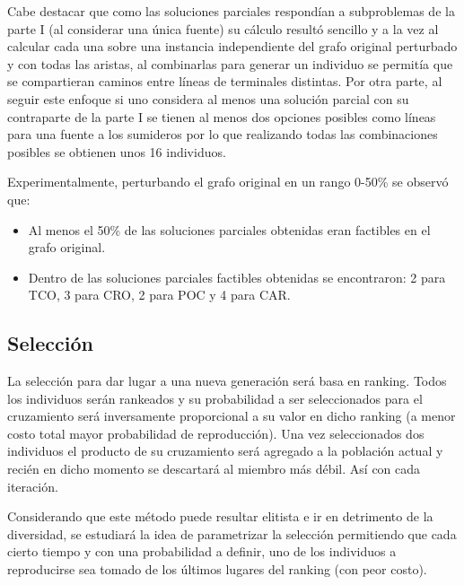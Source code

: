 \documentclass{extarticle}
\begin{document}
Cabe destacar que como las soluciones parciales respondían a subproblemas de la parte I (al considerar una única fuente) su cálculo resultó sencillo y a la vez al calcular cada una sobre una instancia independiente del grafo original perturbado y con todas las aristas, al combinarlas para generar un individuo se permitía que se compartieran caminos entre líneas de terminales distintas.
Por otra parte, al seguir este enfoque si uno considera al menos una solución parcial con su contraparte de la parte I se tienen al menos dos opciones posibles como líneas para una fuente a los sumideros por lo que realizando todas las combinaciones posibles se obtienen unos 16 individuos.

Experimentalmente, perturbando el grafo original en un rango 0-50\% se observó que:
\begin{itemize}
	\item Al menos el 50\% de las soluciones parciales obtenidas eran factibles en el grafo original.
	\item Dentro de las soluciones parciales factibles obtenidas se encontraron: 2 para TCO, 3 para CRO, 2 para POC y 4 para CAR.
\end{itemize}

\subsection{Selección}
La selección para dar lugar a una nueva generación será basa en ranking. Todos los individuos serán rankeados y su probabilidad a ser seleccionados para el cruzamiento será inversamente proporcional a su valor en dicho ranking (a menor costo total mayor probabilidad de reproducción).
Una vez seleccionados dos individuos el producto de su cruzamiento será agregado a la población actual y recién en dicho momento se descartará al miembro más débil. Así con cada iteración.

Considerando que este método puede resultar elitista e ir en detrimento de la diversidad, se estudiará la idea de parametrizar la selección permitiendo que cada cierto tiempo y con una probabilidad a definir, uno de los individuos a reproducirse sea tomado de los últimos lugares del ranking (con peor costo).
\end{document}

